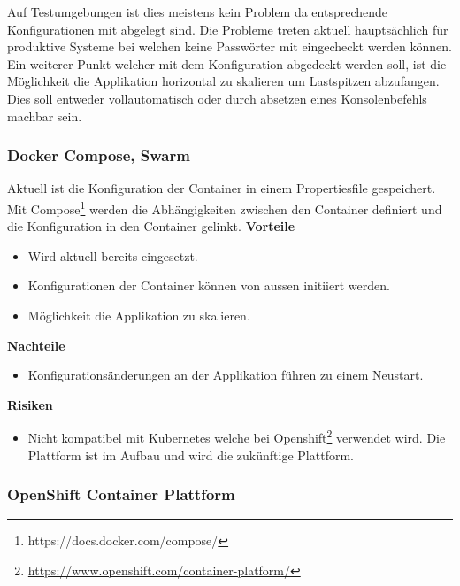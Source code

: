 Auf Testumgebungen ist dies meistens kein Problem da entsprechende Konfigurationen mit abgelegt sind. Die Probleme treten aktuell hauptsächlich für produktive Systeme bei welchen keine Passwörter mit eingecheckt werden können.\newline
Ein weiterer Punkt welcher mit dem Konfiguration abgedeckt werden soll, ist die Möglichkeit die Applikation horizontal zu skalieren um Lastspitzen abzufangen. Dies soll entweder vollautomatisch oder durch absetzen eines Konsolenbefehls machbar sein.

\subsubsection{Docker Compose, Swarm}

Aktuell ist die Konfiguration der Container in einem Propertiesfile gespeichert. Mit Compose\footnote{https://docs.docker.com/compose/} werden die Abhängigkeiten zwischen den Container definiert und die Konfiguration in den Container gelinkt.\newline
\newline
\textbf{Vorteile}
\begin{itemize}
	\item Wird aktuell bereits eingesetzt.
	\item Konfigurationen der Container können von aussen initiiert werden.
	\item Möglichkeit die Applikation zu skalieren.
\end{itemize}
\textbf{Nachteile}
\begin{itemize}
	\item Konfigurationsänderungen an der Applikation führen zu einem Neustart.
\end{itemize}
\textbf{Risiken}
\begin{itemize}
	\item Nicht kompatibel mit Kubernetes welche bei Openshift\footnote{\url{https://www.openshift.com/container-platform/}}  verwendet wird. Die Plattform ist im Aufbau und wird die zukünftige Plattform.
\end{itemize}

\subsubsection{OpenShift Container Plattform}

